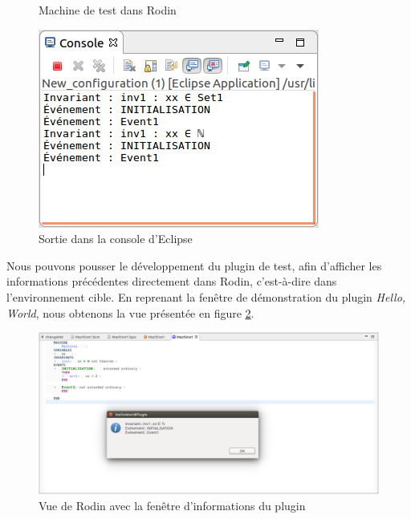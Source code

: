 \begin{figure}[H]
    \centering

    \begin{minipage}{.4\linewidth}
        \caption{Machine de test dans Rodin}
        \label{fig:rodinTestProject}
    \end{minipage}%
    \qquad\qquad%
    \begin{minipage}{.4\linewidth}
        \includegraphics{pictures/rodinPluginConsole.png}
        \caption{Sortie dans la console d'Eclipse}
        \label{fig:rodinPluginConsole}
    \end{minipage}
\end{figure}

Nous pouvons pousser le développement du plugin de test, afin d'afficher les informations précédentes directement dans Rodin, c'est-à-dire dans l'environnement cible.
En reprenant la fenêtre de démonstration du plugin \textit{Hello, World}, nous obtenons la vue présentée en figure \ref{fig:rodinPluginWindow}.

\begin{figure}[H]
    \centering
    \includegraphics{pictures/rodinPluginWindow.png}
    \caption{Vue de Rodin avec la fenêtre d'informations du plugin}
    \label{fig:rodinPluginWindow}
\end{figure}

